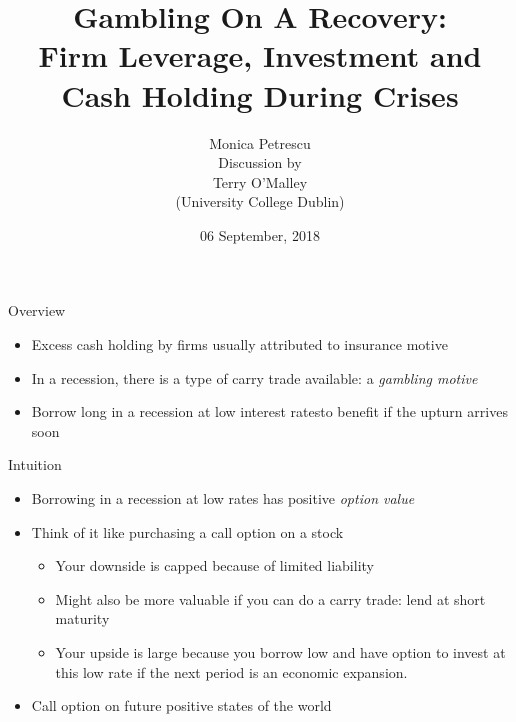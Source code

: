 \documentclass[ignorenonframetext,aspectratio=169]{beamer}
\title{Gambling On A Recovery:\\
Firm Leverage, Investment and Cash Holding During Crises}
\author{Monica Petrescu\\[2\baselineskip]Discussion by\\
Terry O'Malley\\
(University College Dublin)}
\date{06 September, 2018}
\providecommand{\tightlist}{%
  \setlength{\itemsep}{0pt}\setlength{\parskip}{0pt}}
\begin{document}
\frame{\titlepage}

\begin{frame}{Overview}

\begin{itemize}
\item
  Excess cash holding by firms usually attributed to insurance motive
\item
  In a recession, there is a type of carry trade available: a
  \emph{gambling motive}
\item
  Borrow long in a recession at low interest ratesto benefit if the
  upturn arrives soon
\end{itemize}

\end{frame}

\begin{frame}{Intuition}

\begin{itemize}
\item
  Borrowing in a recession at low rates has positive \emph{option value}
\item
  Think of it like purchasing a call option on a stock

  \begin{itemize}
  \tightlist
  \item
    Your downside is capped because of limited liability
  \item
    Might also be more valuable if you can do a carry trade: lend at
    short maturity
  \item
    Your upside is large because you borrow low and have option to
    invest at this low rate if the next period is an economic expansion.
  \end{itemize}
\item
  Call option on future positive states of the world
\end{itemize}

\end{frame}
\end{document}
